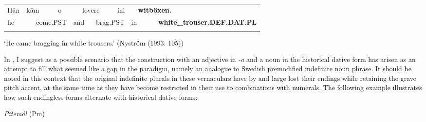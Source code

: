\begin{tabular}{llllllllllll}
\lsptoprule
Hån & \multicolumn{2}{l}{kåm

} & \multicolumn{2}{l}{o

} & \multicolumn{2}{l}{lovere

} & \multicolumn{2}{l}{ini

} & \multicolumn{2}{l}{{\bfseries witböxen.}

} & \\
\multicolumn{2}{l}{he

} & \multicolumn{2}{l}{come.PST

} & \multicolumn{2}{l}{and

} & \multicolumn{2}{l}{brag.PST

} & \multicolumn{2}{l}{in

} & \multicolumn{2}{l}{{\bfseries white\_trouser.DEF.DAT.PL}

}\\
\lspbottomrule
\end{tabular}

\begin{styleTranslation}
‘He came bragging in white trousers.’ (Nyström (1993: 105))

\end{styleTranslation}

\begin{styleBodyTextFirst}
In \citet{Dahl2008}, I suggest as a possible scenario that the construction with an adjective in\textit{ -a} and a noun in the historical dative form has arisen as an attempt to fill what seemed like a gap in the paradigm, namely an analogue to Swedish premodified indefinite noun phrase. It should be noted in this context that the original indefinite plurals in these vernaculars have by and large lost their endings while retaining the grave pitch accent, at the same time as they have become restricted in their use to combinations with numerals. The following example illustrates how such endingless forms alternate with historical dative forms: 

\end{styleBodyTextFirst}


\begin{listWWNumileveli}
\item {}

\begin{styleExample}
\textit{Pitemål} (Pm)

\end{styleExample}

\end{listWWNumileveli}


